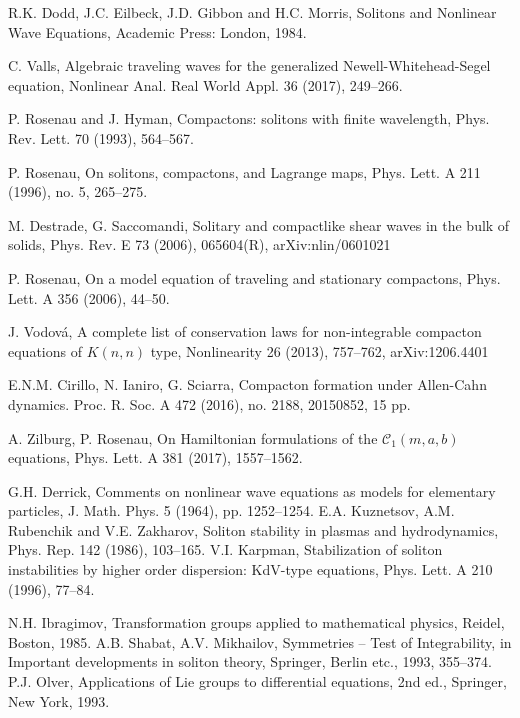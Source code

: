 \documentclass[12pt]{article}
\begin{document}
\begin{thebibliography}{99}
R.K. Dodd, J.C. Eilbeck, J.D. Gibbon and H.C. Morris, {Solitons and Nonlinear Wave Equations}, Academic Press: London, 1984.

C. Valls, Algebraic traveling waves for the generalized Newell-Whitehead-Segel equation, Nonlinear Anal. Real World Appl. 36 (2017), 249--266.

P. Rosenau and J. Hyman, {Compactons: solitons with finite wavelength}, Phys. Rev. Lett.  70   (1993), 564--567.


 P. Rosenau,  On solitons, compactons, and Lagrange maps,
Phys. Lett. A 211 (1996), no. 5, 265--275.

M. Destrade, G. Saccomandi, Solitary and compactlike shear waves in the bulk of solids, Phys. Rev. E 73 (2006), 065604(R), arXiv:nlin/0601021

P. Rosenau, On a model equation of traveling and stationary compactons, Phys. Lett. A 356 (2006), 44--50.


J. Vodov\'a, A complete list of conservation laws for
 non-integrable compacton equations of  $K(n,n)$ type,
{Nonlinearity} 26  (2013), 757--762, arXiv:1206.4401


E.N.M. Cirillo, N. Ianiro, G. Sciarra,
Compacton formation under Allen-Cahn dynamics.
Proc. R. Soc. A 472 (2016), no. 2188, 20150852, 15 pp.

A. Zilburg, P. Rosenau,
On Hamiltonian formulations of the $\mathcal{C}_1(m,a,b)$ equations, Phys. Lett. A 381 (2017), 1557--1562.



 G.H. Derrick, Comments on nonlinear wave equations as models for elementary particles,
 J. Math. Phys. 5  (1964), pp. 1252--1254.
 E.A. Kuznetsov, A.M. Rubenchik and V.E. Zakharov, {Soliton stability in plasmas and hydrodynamics}, Phys. Rep. 142  (1986), 103--165.
V.I. Karpman, Stabilization of soliton instabilities by higher order dispersion: KdV-type equations,  Phys. Lett. A 210  (1996), 77--84.

N.H. Ibragimov, Transformation groups applied to mathematical
physics, Reidel, Boston, 1985.
A.B. Shabat, A.V. Mikhailov, Symmetries -- Test of Integrability, in Important developments in soliton theory,
Springer, Berlin etc., 1993, 355--374.
P.J. Olver, Applications of Lie groups to differential
equations, 2nd ed., Springer, New York, 1993.


\end{thebibliography}
\end{document}
